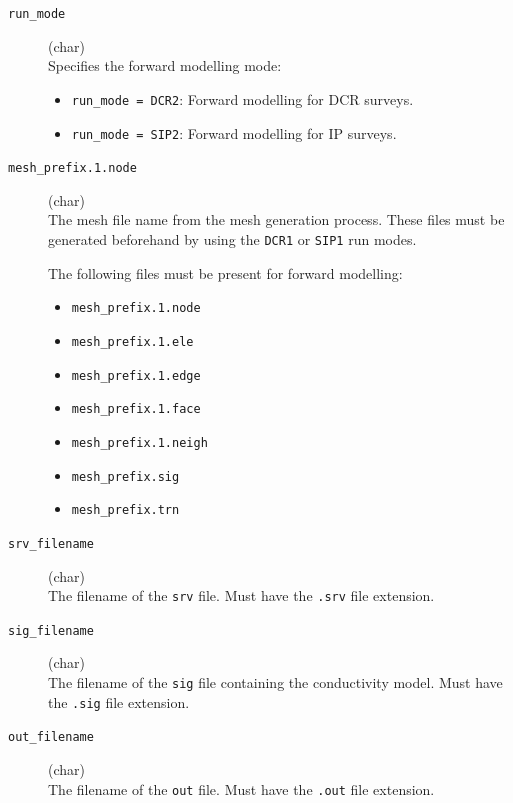 \documentclass[a4paper,12pt]{article}
\begin{document}
\begin{description}
    \item[\texttt{run\_mode}] (char)\hfill \\
          Specifies the forward modelling mode:
          \begin{itemize}
              \item \texttt{run\_mode = DCR2}: Forward modelling for DCR surveys.
              \item \texttt{run\_mode = SIP2}: Forward modelling for IP surveys.
          \end{itemize}

    \item[\texttt{mesh\_prefix.1.node}] (char)\hfill \\
          The mesh file name from the mesh generation process. These files must be generated beforehand by using the \texttt{DCR1} or \texttt{SIP1} run modes.

          The following files must be present for forward modelling:
          \begin{itemize}
              \item \texttt{mesh\_prefix.1.node}
              \item \texttt{mesh\_prefix.1.ele}
              \item \texttt{mesh\_prefix.1.edge}
              \item \texttt{mesh\_prefix.1.face}
              \item \texttt{mesh\_prefix.1.neigh}
              \item \texttt{mesh\_prefix.sig}
              \item \texttt{mesh\_prefix.trn}
          \end{itemize}

    \item[\texttt{srv\_filename}] (char)\hfill \\
          The filename of the \texttt{srv} file. Must have the \texttt{.srv} file extension.

    \item[\texttt{sig\_filename}] (char)\hfill \\
          The filename of the \texttt{sig} file containing the conductivity model. Must have the \texttt{.sig} file extension.

    \item[\texttt{out\_filename}] (char)\hfill \\
          The filename of the \texttt{out} file. Must have the \texttt{.out} file extension.
\end{description}
\end{document}
